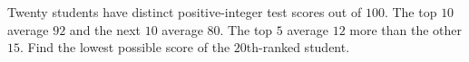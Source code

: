 Twenty students have distinct positive-integer test scores out of $100$. The top $10$ average $92$ and the next $10$ average $80$. The top $5$ average $12$ more than the other $15$. Find the lowest possible score of the $20$th-ranked student.
